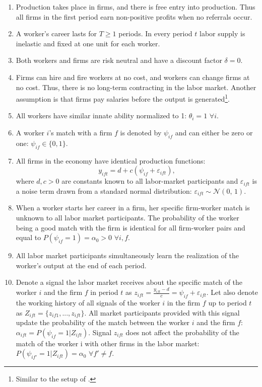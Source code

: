 \documentclass[12pt]{article}
\begin{document}
\begin{enumerate}[label={A}{\arabic*}.]
	\item Production takes place in firms, and there is free entry into production. Thus all firms in the first period earn non-positive profits when no referrals occur.
	\item A worker's career lasts for $T\geq 1$ periods. In every period $t$ labor supply is inelastic and fixed at one unit for each worker.
	\item Both workers and firms are risk neutral and have a discount factor $\delta = 0$.
	\item Firms can hire and fire workers at no cost, and workers can change firms at no cost. Thus, there is no long-term contracting in the labor market. Another assumption is that firms pay salaries before the output is generated\footnote{Similar to the setup of \cite{gibbons1999theory}.}. 
	\item All workers have similar innate ability normalized to 1: $\theta_i = 1$ $\forall i$.
	\item A worker $i$’s match with a firm $f$ is denoted by $\psi_{if}$ and can either be zero or one: $\psi_{if}\in \lbrace0,1\rbrace $.
	\item All firms in the economy have identical production functions:
		\begin{equation}\label{eq:prod_fct}
			y_{ift}=d+c(\psi_{if}+\varepsilon_{ift}),
		\end{equation}
where $d,c >0$ are constants known to all labor-market participants and $\varepsilon_{ift}$ is a noise term drawn from a standard normal distribution: $\varepsilon_{ift}\sim \mathcal{N}(0,\,1)$.
	\item When a worker starts her career in a firm, her specific firm-worker match is unknown to all labor market participants. The probability of the worker being a good match with the firm is identical for all firm-worker pairs and equal to $P(\psi_{if}=1) = \alpha_0>0$ $\forall i,f$. 
	\item All labor market participants simultaneously learn the realization of the worker's output at the end of each period. 
	\item Denote a signal the labor market receives about the specific match of the worker $i$ and the firm $f$ in period $t$ as $z_{ift} = \frac{y_{ift}-d}{c} = \psi_{if}+\varepsilon_{ift}$. Let also denote the working history of all signals of the worker $i$ in the firm $f$ up to period $t$ as $Z_{ift} = \lbrace z_{if1},...,z_{ift}\rbrace$.  All market participants provided with this signal update the probability of the match between the worker $i$ and the firm $f$: $\alpha_{ift} = P(\psi_{if}=1 \vert Z_{ift})$. Signal $z_{ift}$ does not affect the probability of the match of the worker i with other firms in the labor market: $P(\psi_{if'}=1 \vert Z_{ift})=\alpha_0$ $\forall f'\neq f$.
\end{enumerate}	 
\end{document}

